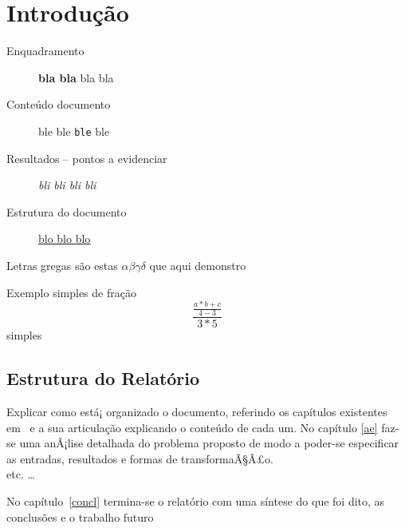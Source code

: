 \chapter*{Introdução} \label{intro}

\begin{description}
  \item [Enquadramento] \textbf{bla bla} bla bla
  \item [Conteúdo documento] \textsf{ble ble} \texttt{ble} ble
  \item [Resultados -- pontos a evidenciar] \textit{bli bli bli bli}
  \item [Estrutura do documento] \underline{blo blo blo}
\end{description}

Letras gregas são estas $ \alpha \beta \gamma \delta $ que aqui demonstro

Exemplo simples de fração \[ \frac{\frac{a * b + c}{4-3}}{3*5} \] simples

\section*{Estrutura do Relatório} 


Explicar como está¡ organizado o documento, referindo os capítulos existentes
em~\cite{yu09} e a sua articulação explicando o conteúdo de cada um.  No
capítulo \ref{ae} faz-se uma anÃ¡lise detalhada do problema proposto de modo
a poder-se especificar  as entradas, resultados e formas de transformaÃ§Ã£o.\\
etc. \ldots


No capítulo~\ref{concl} termina-se o relatório com uma síntese do que foi dito,
as conclusões e o trabalho futuro

